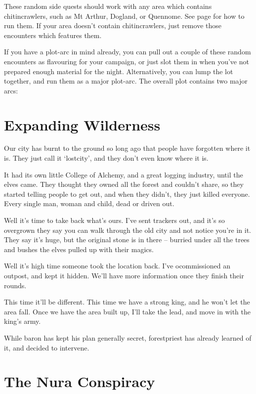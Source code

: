 These random side quests should work with any area which contains chitincrawlers, such as Mt Arthur, Dogland, or Quennome.  See page \pageref{sidequests} for how to run them.  If your area doesn't contain chitincrawlers, just remove those encounters which features them.

If you have a plot-arc in mind already, you can pull out a couple of these random encounters as flavouring for your campaign, or just slot them in when you've not prepared enough material for the night.  Alternatively, you can lump the lot together, and run them as a major plot-arc.  The overall plot contains two major arcs:

\section{Expanding Wilderness}

\begin{speechtext}

	Our city has burnt to the ground so long ago that people have forgotten where it is.  They just call it `\gls{lostcity}', and they don't even know where it is.

	It had its own little College of Alchemy, and a great logging industry, until the elves came.  They thought they owned all the forest and couldn't share, so they started telling people to get out, and when they didn't, they just killed everyone.  Every single man, woman and child, dead or driven out.

	Well it's time to take back what's ours.  I've sent trackers out, and it's so overgrown they say you can walk through the old city and not notice you're in it.  They say it's huge, but the original stone is in there -- burried under all the trees and bushes the elves pulled up with their magics.

	Well it's high time someone took the location back.  I've ocommissioned an outpost, and kept it hidden.  We'll have more information once they finish their rounds.

	This time it'll be different.  This time we have a strong king, and he won't let the area fall.  Once we have the area built up, I'll take the lead, and move in with the king's army.

\end{speechtext}

While \gls{baron} has kept his plan generally secret, \gls{forestpriest} has already learned of it, and decided to intervene.

\section{The Nura Conspiracy}

